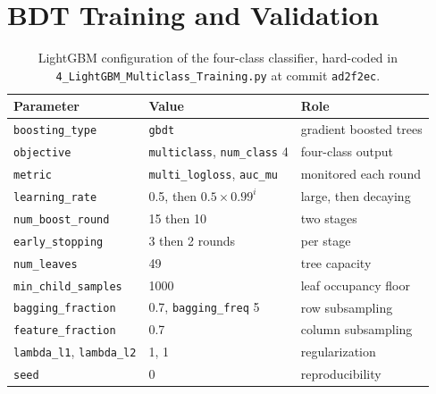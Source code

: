 \section{BDT Training and Validation}
\label{app:mva}

\begin{table}[htbp]
  \centering
  \caption{LightGBM configuration of the four-class classifier, hard-coded in
  \texttt{4\_LightGBM\_Multiclass\_Training.py} at commit \texttt{ad2f2ec}.}
  \label{tab:mva-hyperparameters}
  \small
  \begin{tabular}{l l l}
    \hline
    Parameter & Value & Role \\
    \hline
    \texttt{boosting\_type} & \texttt{gbdt} & gradient boosted trees \\
    \texttt{objective} & \texttt{multiclass}, \texttt{num\_class} 4 & four-class output \\
    \texttt{metric} & \texttt{multi\_logloss}, \texttt{auc\_mu} & monitored each round \\
    \texttt{learning\_rate} & 0.5, then $0.5 \times 0.99^{i}$ & large, then decaying \\
    \texttt{num\_boost\_round} & 15 then 10 & two stages \\
    \texttt{early\_stopping} & 3 then 2 rounds & per stage \\
    \texttt{num\_leaves} & 49 & tree capacity \\
    \texttt{min\_child\_samples} & 1000 & leaf occupancy floor \\
    \texttt{bagging\_fraction} & 0.7, \texttt{bagging\_freq} 5 & row subsampling \\
    \texttt{feature\_fraction} & 0.7 & column subsampling \\
    \texttt{lambda\_l1}, \texttt{lambda\_l2} & 1, 1 & regularization \\
    \texttt{seed} & 0 & reproducibility \\
    \hline
  \end{tabular}
\end{table}

